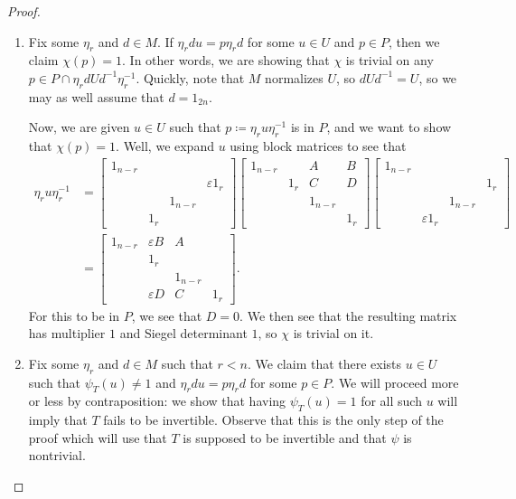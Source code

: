 \begin{proof}
\begin{enumerate}

		\item Fix some $\eta_r$ and $d\in M$. If $\eta_rdu=p\eta_rd$ for some $u\in U$ and $p\in P$, then we claim $\chi(p)=1$. In other words, we are showing that $\chi$ is trivial on any $p\in P\cap\eta_rdUd^{-1}\eta_r^{-1}$. Quickly, note that $M$ normalizes $U$, so $dUd^{-1}=U$, so we may as well assume that $d=1_{2n}$.

		Now, we are given $u\in U$ such that $p\coloneqq\eta_ru\eta_r^{-1}$ is in $P$, and we want to show that $\chi(p)=1$. Well, we expand $u$ using block matrices to see that
		\begin{align*}
			\eta_ru\eta_r^{-1} &= \begin{bmatrix}
				1_{n-r} \\ &&& \varepsilon1_r \\
				&& 1_{n-r} \\ & 1_r
			\end{bmatrix}\begin{bmatrix}
				1_{n-r} && A & B \\ & 1_r & C & D \\
				&& 1_{n-r} \\ &&& 1_r
			\end{bmatrix}\begin{bmatrix}
				1_{n-r} \\ &&& 1_r \\
				&& 1_{n-r} \\ & \varepsilon1_r
			\end{bmatrix} \\
			&= \begin{bmatrix}
				1_{n-r} & \varepsilon B & A \\ & 1_r \\
				&& 1_{n-r} \\ & \varepsilon D & C & 1_r
			\end{bmatrix}.
		\end{align*}
		For this to be in $P$, we see that $D=0$. We then see that the resulting matrix has multiplier $1$ and Siegel determinant $1$, so $\chi$ is trivial on it.

		\item Fix some $\eta_r$ and $d\in M$ such that $r<n$. We claim that there exists $u\in U$ such that $\psi_T(u)\ne1$ and $\eta_rdu=p\eta_rd$ for some $p\in P$. We will proceed more or less by contraposition: we show that having $\psi_T(u)=1$ for all such $u$ will imply that $T$ fails to be invertible. Observe that this is the only step of the proof which will use that $T$ is supposed to be invertible and that $\psi$ is nontrivial.


\end{enumerate}
\end{proof}
